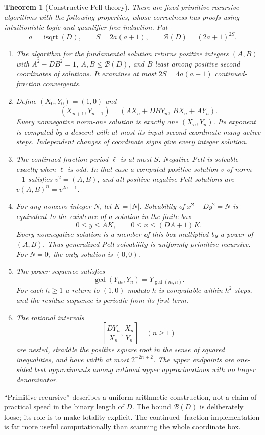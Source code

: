 \documentclass[11pt,letterpaper]{article}
\newtheorem{theorem}{Theorem}[section]
\theoremstyle{definition}
\newcommand{\isqrt}{\operatorname{isqrt}}
\newcommand{\CFB}{\mathcal B}
\newcommand{\abs}[1]{\lvert#1\rvert}
\begin{document}
\begin{theorem}[Constructive Pell theory]\label{thm:main}
There are fixed primitive recursive algorithms with the following properties,
whose correctness has proofs using intuitionistic logic and quantifier-free
induction. Put
\[
 a=\isqrt(D),\qquad S=2a(a+1),\qquad
 \CFB(D)=(2a+1)^{2S}.
\]
\begin{enumerate}
\item The algorithm for the fundamental solution returns positive integers
$(A,B)$ with $A^2-DB^2=1$, $A,B\le\CFB(D)$, and $B$ least among positive
second coordinates of solutions. It examines at most $2S=4a(a+1)$ continued-
fraction convergents.
\item Define $(X_0,Y_0)=(1,0)$ and
\[
 (X_{n+1},Y_{n+1})=(AX_n+DBY_n,\ BX_n+AY_n).
\]
Every nonnegative norm-one solution is exactly one $(X_n,Y_n)$. Its exponent is
computed by a descent with at most its input second coordinate many active
steps. Independent changes of coordinate signs give every integer solution.
\item The continued-fraction period $\ell$ is at most $S$. Negative Pell is
solvable exactly when $\ell$ is odd. In that case a computed positive solution
$v$ of norm $-1$ satisfies $v^2=(A,B)$, and all positive negative-Pell
solutions are $v(A,B)^n=v^{2n+1}$.
\item For any nonzero integer $N$, let $K=\abs N$. Solvability of
$x^2-Dy^2=N$ is equivalent to the existence of a solution in the finite box
\[
 0\le y\le AK,\qquad 0\le x\le(DA+1)K.
\]
Every nonnegative solution is a member of this box multiplied by a power of
$(A,B)$. Thus generalized Pell solvability is uniformly primitive recursive.
For $N=0$, the only solution is $(0,0)$.
\item The power sequence satisfies
\[
 \gcd(Y_m,Y_n)=Y_{\gcd(m,n)}.
\]
For each $h\ge1$ a return to $(1,0)$ modulo $h$ is computable within $h^2$
steps, and the residue sequence is periodic from its first term.
\item The rational intervals
\[
 \left[\frac{DY_n}{X_n},\frac{X_n}{Y_n}\right]\quad(n\ge1)
\]
are nested, straddle the positive square root in the sense of squared
inequalities, and have width at most $2^{-2n+2}$. The upper endpoints are
one-sided best approximants among rational upper approximations with no
larger denominator.
\end{enumerate}
\end{theorem}

``Primitive recursive'' describes a uniform arithmetic construction, not a
claim of practical speed in the binary length of $D$. The bound $\CFB(D)$ is
deliberately loose; its role is to make totality explicit. The continued-
fraction implementation is far more useful computationally than scanning the
whole coordinate box.
\end{document}
